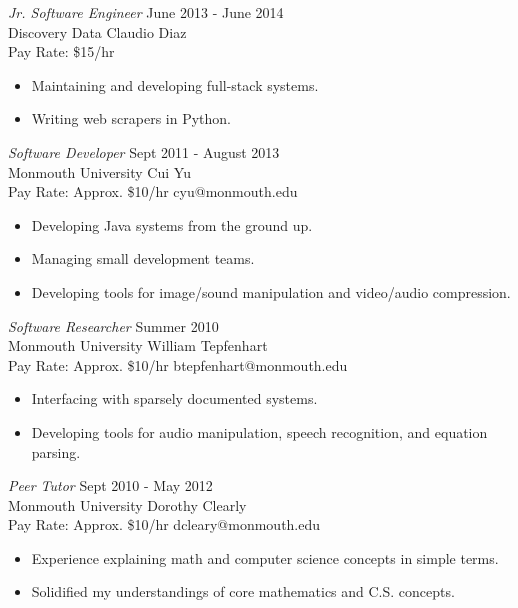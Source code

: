 \documentclass[margin]{res}
\begin{document}
\begin{resume}
	{\sl Jr. Software Engineer} \hfill June 2013 - June 2014 \\
	Discovery Data \hfill Claudio Diaz\\
	Pay Rate: \$15/hr \hfill
	\begin{itemize}  \itemsep -2pt
		\item Maintaining and developing full-stack systems.
		\item Writing web scrapers in Python.
	\end{itemize}
	
	{\sl Software Developer} \hfill Sept 2011 - August 2013 \\
	Monmouth University \hfill Cui Yu\\
	Pay Rate: Approx. \$10/hr \hfill cyu@monmouth.edu
	\begin{itemize}  \itemsep -2pt
		\item Developing Java systems from the ground up.
		\item Managing small development teams.
		\item Developing tools for image/sound manipulation and video/audio compression.
	\end{itemize}
	
	{\sl Software Researcher} \hfill Summer 2010 \\
	Monmouth University \hfill William Tepfenhart\\
	Pay Rate: Approx. \$10/hr \hfill btepfenhart@monmouth.edu
	\begin{itemize}  \itemsep -2pt
		\item Interfacing with sparsely documented systems.
		\item Developing tools for audio manipulation, speech recognition, and equation parsing. 
	\end{itemize}

	{\sl Peer Tutor} \hfill Sept 2010 - May 2012 \\
	Monmouth University \hfill Dorothy Clearly\\
	Pay Rate: Approx. \$10/hr \hfill dcleary@monmouth.edu
	\begin{itemize}  \itemsep -2pt
		\item Experience explaining math and computer science concepts in simple terms.
		\item Solidified my understandings of core mathematics and C.S. concepts.
	\end{itemize}

\end{resume}
\end{document}
